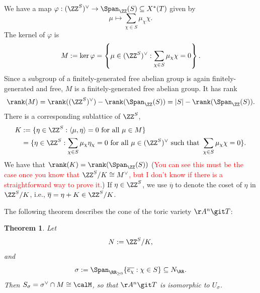 \documentclass[12pt]{amsart}
\theoremstyle{plain}
\newtheorem{theorem}{Theorem}[subsection]
\begin{document}
We have a map $\varphi:(\ZZ^S)^\vee \to \Span_\ZZ(S) \subseteq X^*(T)$ given by
$$\mu \mapsto \sum_{\chi\in S} \mu_\chi \chi.$$
The kernel of $\varphi$ is
$$M := \ker \varphi = \left\{\mu \in (\ZZ^S)^\vee : \sum_{\chi \in S} \mu_\chi \chi = 0\right\}.$$
Since a subgroup of a finitely-generated free abelian group is again finitely-generated and free, $M$ is a finitely-generated free abelian group.
It has rank
$$\rank(M) = \rank((\ZZ^S)^\vee) - \rank(\Span_\ZZ(S)) = |S| - \rank(\Span_\ZZ(S)).$$
There is a corresponding sublattice of $\ZZ^S$, 
\begin{align*}
	K &:= \{\eta \in \ZZ^S : \langle \mu, \eta \rangle = 0 \text{ for all } \mu \in M\} \\
	   &= \{\eta \in \ZZ^S : \sum_{\chi \in S} \mu_\chi \eta_\chi = 0 \text{ for all } \mu \in (\ZZ^S)^\vee \text{ such that } \sum_{\chi \in S} \mu_\chi \chi = 0 \}.
\end{align*}
We have that $\rank(K) = \rank(\Span_\ZZ(S))$ (\textcolor{red}{You can see this must be the case once you know that $\ZZ^S/K \cong M^\vee$, but I don't know if there is a straightforward way to prove it.})
If $\eta \in \ZZ^S$, we use $\overline{\eta}$ to denote the coset of $\eta$ in $\ZZ^S/K$, i.e., $\overline{\eta} = \eta + K \in \ZZ^S/K$.

The following theorem describes the cone of the toric variety $\AA^n \git T$:

\begin{theorem}\label{gitlatticetheorem}
Let 
$$N := \ZZ^S / K,$$
and 
$$\sigma := \Span_{\RR_{\ge 0}} \{\overline{e_\chi} : \chi \in S\} \subseteq N_\RR.$$
Then $S_\sigma = \sigma^\vee \cap M \cong \calM$, so that $\AA^n \git T$ is isomorphic to $U_\sigma$.
\end{theorem}
\end{document}

